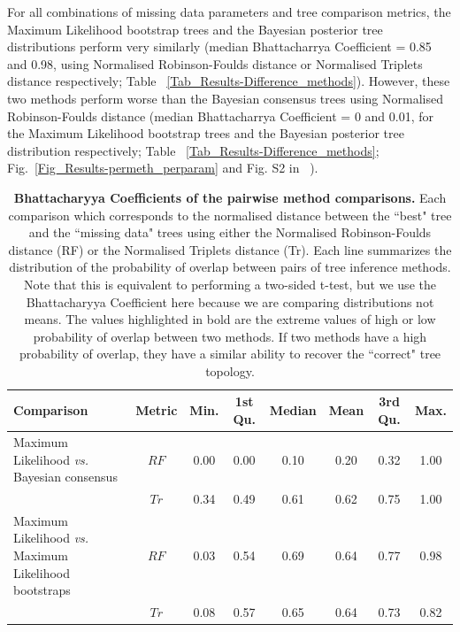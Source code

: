 \documentclass[10pt,letterpaper]{article}
\begin{document}
For all combinations of missing data parameters and tree comparison metrics, the Maximum Likelihood bootstrap trees and the Bayesian posterior tree distributions perform very similarly (median Bhattacharrya Coefficient = 0.85 and 0.98, using Normalised Robinson-Foulds distance or Normalised Triplets distance respectively; Table ~\ref{Tab_Results-Difference_methods}). However, these two methods perform worse than the Bayesian consensus trees using Normalised Robinson-Foulds distance (median Bhattacharrya Coefficient = 0 and 0.01, for the Maximum Likelihood bootstrap trees and the Bayesian posterior tree distribution respectively; Table ~\ref{Tab_Results-Difference_methods}; Fig.~\ref{Fig_Results-permeth_perparam} and Fig. S2 in ~).

\begin{table}[!ht]
\begin{adjustwidth}{-2.25in}{0in} %
\caption{{\bf Bhattacharyya Coefficients of the pairwise method comparisons.}
Each comparison which corresponds to the normalised distance between the ``best" tree and the ``missing data" trees using either the Normalised Robinson-Foulds distance (RF) or the Normalised Triplets distance (Tr). Each line summarizes the distribution of the probability of overlap between pairs of tree inference methods. Note that this is equivalent to performing a two-sided t-test, but we use the Bhattacharyya Coefficient here because we are comparing distributions not means. The values highlighted in bold are the extreme values of high or low probability of overlap between two methods. If two methods have a high probability of overlap, they have a similar ability to recover the ``correct" tree topology.}
\centering
\begin{tabular}{|l|c|c|c|c|c|c|c|}
  \hline
 Comparison &  Metric & Min. & 1st Qu. & Median & Mean & 3rd Qu. & Max. \\ 
  \hline
    Maximum Likelihood \textit{vs.} Bayesian consensus                 & $RF$ & 0.00 & 0.00 & 0.10 & 0.20 & 0.32 & 1.00 \\ 
                                                                       & $Tr$ & 0.34 & 0.49 & 0.61 & 0.62 & 0.75 & 1.00 \\ 
    Maximum Likelihood \textit{vs.} Maximum Likelihood bootstraps      & $RF$ & 0.03 & 0.54 & 0.69 & 0.64 & 0.77 & 0.98 \\ 
                                                                       & $Tr$ & 0.08 & 0.57 & 0.65 & 0.64 & 0.73 & 0.82 \\ 

\end{tabular}
\end{adjustwidth}
\end{table}
\end{document}
